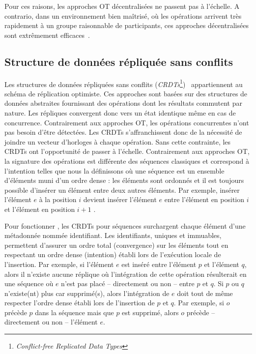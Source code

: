 Pour ces raisons, les approches OT décentralisées ne passent pas à l'échelle. A
contrario, dans un environnement bien maîtrisé, où les opérations arrivent très
rapidement à un groupe raisonnable de participants, ces approches décentralisées
sont extrêmement efficaces~\cite{mehdi2014merging}.

\subsection{Structure de données répliquée sans conflits}
\label{repl:subsec:crdts}

Les structures de données répliquées sans conflits
(\emph{CRDTs}\footnote{\emph{Conflict-free Replicated Data
    Types}})~\cite{shapiro2011comprehensive, shapiro2011conflict} appartiennent
au schéma de réplication optimiste. Ces approches sont basées sur des structures
de données abstraites fournissant des opérations dont les résultats commutent
par nature. Les répliques convergent donc vers un état identique même en cas de
concurrence. Contrairement aux approches OT, les opérations concurrentes n'ont
pas besoin d'être détectées. Les CRDTs s'affranchissent donc de la nécessité de
joindre un vecteur d'horloges à chaque opération. Sans cette contrainte, les
CRDTs ont l'opportunité de passer à l'échelle. Contrairement aux approches OT,
la signature des opérations est différente des séquences \og classiques \fg et
correspond à l'intention telles que nous la définissons où une séquence est un
ensemble d'éléments muni d'un ordre dense : les éléments sont ordonnés et il est
toujours possible d'insérer un élément entre deux autres éléments. Par exemple,
\og insérer l'élément $e$ à la position $i$ \fg devient \og insérer l'élément
$e$ entre l'élément en position $i$ et l'élément en position $i+1$ \fg.

Pour fonctionner , les CRDTs pour séquences surchargent chaque élément d'une
métadonnée nommée identifiant. Les identifiants, uniques et immuables,
permettent d'assurer un ordre total (convergence) sur les éléments tout en
respectant un ordre dense (intention) établi lors de l'exécution locale de
l'insertion. Par exemple, si l'élément $e$ est inséré entre l'élément $p$ et
l'élément $q$, alors il n'existe aucune réplique où l'intégration de cette
opération résulterait en une séquence où $e$ n'est pas placé -- directement ou
non -- entre $p$ et $q$.  Si $p$ ou $q$ n'existe(nt) plus car supprimé(s), alors
l'intégration de $e$ doit tout de même respecter l'ordre dense établi lors de
l'insertion de $p$ et $q$. Par exemple, si $o$ précède $p$ dans la séquence mais
que $p$ est supprimé, alors $o$ précède -- directement ou non -- l'élément $e$.

